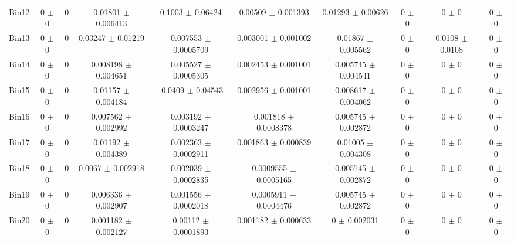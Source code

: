 \begin{tabular}{@{\extracolsep{4pt}}lccccccccc@{}}
     Bin12 & 0 $\pm$ 0 & 0 & 0.01801 $\pm$ 0.006413 & 0.1003 $\pm$ 0.06424 & 0.00509 $\pm$ 0.001393 & 0.01293 $\pm$ 0.00626 & 0 $\pm$ 0 & 0 $\pm$ 0 & 0 $\pm$ 0 \\ 
     Bin13 & 0 $\pm$ 0 & 0 & 0.03247 $\pm$ 0.01219 & 0.007553 $\pm$ 0.0005709 & 0.003001 $\pm$ 0.001002 & 0.01867 $\pm$ 0.005562 & 0 $\pm$ 0 & 0.0108 $\pm$ 0.0108 & 0 $\pm$ 0 \\ 
     Bin14 & 0 $\pm$ 0 & 0 & 0.008198 $\pm$ 0.004651 & 0.005527 $\pm$ 0.0005305 & 0.002453 $\pm$ 0.001001 & 0.005745 $\pm$ 0.004541 & 0 $\pm$ 0 & 0 $\pm$ 0 & 0 $\pm$ 0 \\ 
     Bin15 & 0 $\pm$ 0 & 0 & 0.01157 $\pm$ 0.004184 & -0.0409 $\pm$ 0.04543 & 0.002956 $\pm$ 0.001001 & 0.008617 $\pm$ 0.004062 & 0 $\pm$ 0 & 0 $\pm$ 0 & 0 $\pm$ 0 \\ 
     Bin16 & 0 $\pm$ 0 & 0 & 0.007562 $\pm$ 0.002992 & 0.003192 $\pm$ 0.0003247 & 0.001818 $\pm$ 0.0008378 & 0.005745 $\pm$ 0.002872 & 0 $\pm$ 0 & 0 $\pm$ 0 & 0 $\pm$ 0 \\ 
     Bin17 & 0 $\pm$ 0 & 0 & 0.01192 $\pm$ 0.004389 & 0.002363 $\pm$ 0.0002911 & 0.001863 $\pm$ 0.000839 & 0.01005 $\pm$ 0.004308 & 0 $\pm$ 0 & 0 $\pm$ 0 & 0 $\pm$ 0 \\ 
     Bin18 & 0 $\pm$ 0 & 0 & 0.0067 $\pm$ 0.002918 & 0.002039 $\pm$ 0.0002835 & 0.0009555 $\pm$ 0.0005165 & 0.005745 $\pm$ 0.002872 & 0 $\pm$ 0 & 0 $\pm$ 0 & 0 $\pm$ 0 \\ 
     Bin19 & 0 $\pm$ 0 & 0 & 0.006336 $\pm$ 0.002907 & 0.001556 $\pm$ 0.0002018 & 0.0005911 $\pm$ 0.0004476 & 0.005745 $\pm$ 0.002872 & 0 $\pm$ 0 & 0 $\pm$ 0 & 0 $\pm$ 0 \\ 
     Bin20 & 0 $\pm$ 0 & 0 & 0.001182 $\pm$ 0.002127 & 0.00112 $\pm$ 0.0001893 & 0.001182 $\pm$ 0.000633 & 0 $\pm$ 0.002031 & 0 $\pm$ 0 & 0 $\pm$ 0 & 0 $\pm$ 0 \\ 
\hline\hline
  \end{tabular}
